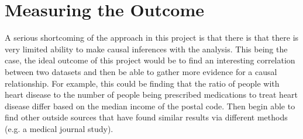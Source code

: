 \documentclass[a4paper]{article}
\begin{document}
\section{Measuring the Outcome}
	A serious shortcoming of the approach in this project is that there is that there is very limited 
	ability to make causal inferences with the analysis. This being the case,
	the ideal outcome of this project would be to find an interesting correlation between two datasets 
	and then be able to gather more evidence for a causal relationship. For example, this could be
	finding that the ratio of people with heart disease to the number of people being prescribed
	medications to treat heart disease differ based on the median income of the postal code. Then 
	begin able to find other outside sources that have found similar results via different methods
	(e.g. a medical journal study). 


\printbibliography
\end{document}
